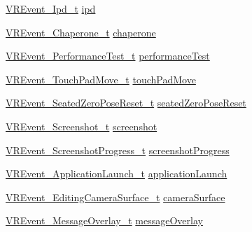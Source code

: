 \begin{DoxyCompactItemize}
\item 
\mbox{\hyperlink{struct_valve_1_1_v_r_1_1_v_r_event___ipd__t}{V\+R\+Event\+\_\+\+Ipd\+\_\+t}} \mbox{\hyperlink{struct_valve_1_1_v_r_1_1_v_r_event___data__t_aa9a748c9f2357baa810ef62ffd6f5f4e}{ipd}}
\item 
\mbox{\hyperlink{struct_valve_1_1_v_r_1_1_v_r_event___chaperone__t}{V\+R\+Event\+\_\+\+Chaperone\+\_\+t}} \mbox{\hyperlink{struct_valve_1_1_v_r_1_1_v_r_event___data__t_ab118266b879e1ae93c886642474e71b2}{chaperone}}
\item 
\mbox{\hyperlink{struct_valve_1_1_v_r_1_1_v_r_event___performance_test__t}{V\+R\+Event\+\_\+\+Performance\+Test\+\_\+t}} \mbox{\hyperlink{struct_valve_1_1_v_r_1_1_v_r_event___data__t_a35b7307edaa7f548fbf83eecc81b12cf}{performance\+Test}}
\item 
\mbox{\hyperlink{struct_valve_1_1_v_r_1_1_v_r_event___touch_pad_move__t}{V\+R\+Event\+\_\+\+Touch\+Pad\+Move\+\_\+t}} \mbox{\hyperlink{struct_valve_1_1_v_r_1_1_v_r_event___data__t_a2c9a71ecef85dbd6da8f0812513e4594}{touch\+Pad\+Move}}
\item 
\mbox{\hyperlink{struct_valve_1_1_v_r_1_1_v_r_event___seated_zero_pose_reset__t}{V\+R\+Event\+\_\+\+Seated\+Zero\+Pose\+Reset\+\_\+t}} \mbox{\hyperlink{struct_valve_1_1_v_r_1_1_v_r_event___data__t_a945a26b3f79bbe6afc6d23d43e77adc0}{seated\+Zero\+Pose\+Reset}}
\item 
\mbox{\hyperlink{struct_valve_1_1_v_r_1_1_v_r_event___screenshot__t}{V\+R\+Event\+\_\+\+Screenshot\+\_\+t}} \mbox{\hyperlink{struct_valve_1_1_v_r_1_1_v_r_event___data__t_a31bf248e4356b6f41d4148bdea4c520a}{screenshot}}
\item 
\mbox{\hyperlink{struct_valve_1_1_v_r_1_1_v_r_event___screenshot_progress__t}{V\+R\+Event\+\_\+\+Screenshot\+Progress\+\_\+t}} \mbox{\hyperlink{struct_valve_1_1_v_r_1_1_v_r_event___data__t_a83c3f164a18dfa971dbfc12cc5c30c3d}{screenshot\+Progress}}
\item 
\mbox{\hyperlink{struct_valve_1_1_v_r_1_1_v_r_event___application_launch__t}{V\+R\+Event\+\_\+\+Application\+Launch\+\_\+t}} \mbox{\hyperlink{struct_valve_1_1_v_r_1_1_v_r_event___data__t_adfbd7de401c6c30f077a7e6a43b14f12}{application\+Launch}}
\item 
\mbox{\hyperlink{struct_valve_1_1_v_r_1_1_v_r_event___editing_camera_surface__t}{V\+R\+Event\+\_\+\+Editing\+Camera\+Surface\+\_\+t}} \mbox{\hyperlink{struct_valve_1_1_v_r_1_1_v_r_event___data__t_a60ef3a5b209973754ed25a021820bd3c}{camera\+Surface}}
\item 
\mbox{\hyperlink{struct_valve_1_1_v_r_1_1_v_r_event___message_overlay__t}{V\+R\+Event\+\_\+\+Message\+Overlay\+\_\+t}} \mbox{\hyperlink{struct_valve_1_1_v_r_1_1_v_r_event___data__t_aedd176a4bba58548a2dd487ad6661923}{message\+Overlay}}

\end{DoxyCompactItemize}
